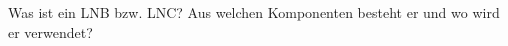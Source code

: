 \begin{question}[section=11,name={LNB und LNC},difficulty=,quantity=,type=thr,tags={20131024}]
	Was ist ein LNB bzw. LNC? Aus welchen Komponenten besteht er und wo wird er verwendet?
	
	
\end{question}
\begin{solution}
	
\end{solution}